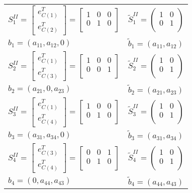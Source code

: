 \begin{tabular} { l | l}
	$S_1^{II} = \begin{bmatrix}
		e_{C(1)}^T\\
		e_{C(2)}^T
	\end{bmatrix}= \begin{bmatrix}
		1	& 0	& 0	\\
		0	& 1	& 0	\\
	\end{bmatrix}$
	&
	$\tilde{S}_1^{II}=\begin{pmatrix}
	1	& 0\\
	0	& 1\\
	\end{pmatrix}$
	\\
	$b_1 = (a_{11}, a_{12},0)$ & $\tilde{b}_1 = (a_{11},a_{12})$
	\\
	\hline
	$S_2^{II} = \begin{bmatrix}
	e_{C(1)}^T\\
	e_{C(3)}^T
	\end{bmatrix} = \begin{bmatrix}
	1	& 0	& 0	\\
	0	& 0	& 1	\\
	\end{bmatrix}$
	&
	$\tilde{S}_2^{II} = \begin{pmatrix}
	1&0\\
	0&1\\
	\end{pmatrix}$
	\\
	$b_2 = (a_{21}, 0, a_{23})$&$\tilde{b}_2 = (a_{21},a_{23})$
	\\
	\hline
	$S_3^{II} = \begin{bmatrix}
	e_{C(1)}^T\\
	e_{C(4)}^T
	\end{bmatrix} = \begin{bmatrix}
	1	& 0	& 0	\\
	0	& 1	& 0	\\
	\end{bmatrix}$
	&
	$\tilde{S}_3^{II} = \begin{pmatrix}
	1&0\\
	0&1\\
	\end{pmatrix}$
	\\
	$b_3 = (a_{31}, a_{34},0)$&$\tilde{b}_3 = (a_{31},a_{34})$
	\\
	\hline
	$S_4^{II} = \begin{bmatrix}
	e_{C(3)}^T\\
	e_{C(4)}^T
	\end{bmatrix} = \begin{bmatrix}
	0	& 0	& 1	\\
	0	& 1	& 0	\\
	\end{bmatrix}$
	&	
	$\tilde{S}_4^{II} = \begin{pmatrix}
	1&0\\
	0&1\\
	\end{pmatrix}$\\
	$b_4 = (0,a_{44}, a_{43})$&$\tilde{b}_4 = (a_{44},a_{43})$\\	
\end{tabular}

